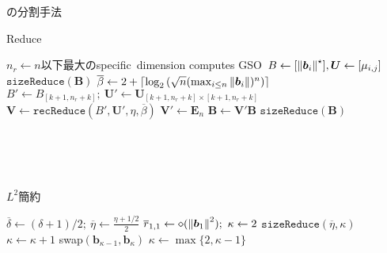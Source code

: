 \documentclass[12pt,aspectratio=169,table,dvipdfmx, leqno]{beamer}
\begin{document}
\begin{frame}{\cite{NS16}の分割手法}
\begin{minipage}[b]{0.45\columnwidth}
\begin{algorithm}[H]
    \footnotesize
    \begin{algorithmic}[1]
        \caption{\footnotesize Reduce\cite{NS16}}
        \label{alg_REDUCE}
        \State $n_r\gets n$以下最大のspecific~dimension
        \State computes GSO~$B\gets[\norm{\bm{b}_i}^\star], \bm{U}\gets [\mu_{i, j}]$
        \State $\texttt{sizeReduce}(\bm{B})$
        \State $\overline{\beta}\gets 2+\lceil \log_2{(\sqrt{n}(\max_{i\le n}\norm{\bm{b}_i})^n)}\rceil$
                \State $B'\gets B_{[k+1, n_r+k]};~\bm{U}'\gets \bm{U}_{[k+1, n_r+k]\times [k+1, n_r+k]}$
                \State $\bm{V}\gets\texttt{recReduce}(B', \bm{U}', \eta, \overline{\beta})$
                \State $\bm{V}'\gets \bm{E}_n$
                \State $\bm{B}\gets \bm{V}'\bm{B}$
                \State $\texttt{sizeReduce}(\bm{B})$
            \EndFor
        \EndFor
    \end{algorithmic}
\end{algorithm}
\mbox{}\\
\mbox{}\\
\mbox{}\\
\end{minipage}
\hspace{0.03\columnwidth} %
\begin{minipage}[b]{0.45\columnwidth}
\begin{algorithm}[H]
    \footnotesize
    \begin{algorithmic}[1]
        \caption{\footnotesize $L^2$簡約\cite{Stehle10}}
        \label{alg_L2_2}
        \State $\overline{\delta}\gets(\delta+1)/2;~\overline{\eta}\gets\frac{\eta+1/2}{2}$
        \State $\overline{r}_{1,1}\gets\diamond(\norm{\bm{b}_1}^2);~\kappa\gets 2$
            \State $\texttt{sizeReduce}(\overline{\eta}, \kappa)$
                \State $\kappa\gets\kappa+1$
            \Else
                \State swap$(\bm{b}_{\kappa-1}, \bm{b}_\kappa)$
                \State $\kappa\gets \max\{2, \kappa-1\}$
            \EndIf
        \EndWhile
    \end{algorithmic}
\end{algorithm}
    \mbox{}\\
\end{minipage}
\end{frame}
\end{document}
